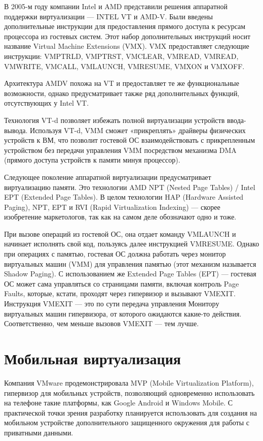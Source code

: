 \documentclass[10pt, a5paper]{article}
\begin{document}
В 2005-м году компании Intel и AMD представили решения аппаратной  поддержки виртуализации --- INTEL VT и AMD-V. Были введены дополнительные инструкции для предоставления прямого доступа к ресурсам процессора из гостевых систем. Этот набор дополнительных инструкций носит название Virtual Machine Extensions (VMX). VMX предоставляет следующие инструкции: VMPTRLD, VMPTRST, VMCLEAR, VMREAD, VMREAD, VMWRITE, VMCALL, VMLAUNCH, VMRESUME, VMXON и VMXOFF.

Архитектура AMDV похожа на VT и предоставляет те же функциональные возможности, однако предусматривает также ряд дополнительных функций, отсутствующих у Intel VT.

Технология VT-d позволяет избежать полной виртуализации устройств ввода-вывода. Используя VT-d, VMM сможет «прикреплять» драйверы физических устройств к ВМ, что позволит гостевой ОС взаимодействовать с прикрепленным устройством без передачи управления VMM посредством механизма DMA (прямого доступа устройств к памяти минуя процессор).

Следующее поколение аппаратной виртуализации предусматривает виртуализацию памяти. Это технологии AMD NPT (Nested Page Tables) / Intel EPT (Extended Page Tables). В целом технологии HAP (Hardware Assisted Paging), NPT, EPT и RVI (Rapid Virtualization Indexing) --- скорее изобретение маркетологов, так как на самом деле обозначают одно и тоже.

При  вызове операций из гостевой ОС, она отдает команду VMLAUNCH и начинает исполнять свой код, пользуясь далее инструкцией VMRESUME. Однако при операциях с памятью, гостевая ОС должна работать через монитор виртуальных машин (VMM) для управления памятью (этот механизм называется Shadow Paging). С использованием же Extended Page Tables (EPT) --- гостевая ОС может сама управляться со страницами памяти, включая контроль Page Faults, которые, кстати, проходят через гипервизор и вызывают VMEXIT. Инструкция VMEXIT --- это по сути передача управления Монитору виртуальных машин гипервизора, от которого ожидаются какие-то действия. Соответственно, чем меньше вызовов VMEXIT --- тем лучше.

\section*{Мобильная виртуализация}

Компания VMware продемонстрировала MVP (Mobile Virtualization Platform), гипервизор для мобильных устройств, позволяющий одновременно использовать на телефоне такие платформы, как Google Android и Windows Mobile. С практической точки зрения разработку планируется использовать для создания на мобильном устройстве дополнительного защищенного окружения для работы с приватными данными. 
\end{document}
